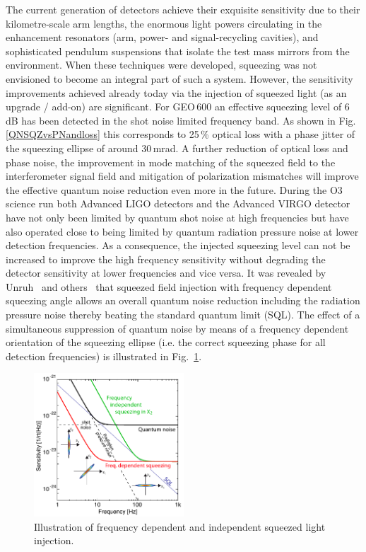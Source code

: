 The current generation of detectors achieve their exquisite sensitivity due to their kilometre-scale arm lengths, the enormous light powers circulating in the enhancement resonators (arm, power- and signal-recycling cavities), and sophisticated pendulum suspensions that isolate the test mass mirrors from the environment. When these techniques were developed, squeezing was not envisioned to become an integral part of such a system. However, the sensitivity improvements achieved already today via the injection of squeezed light (as an upgrade / add-on) are significant. For GEO\,600 an effective squeezing level of 6\,dB has been detected in the shot noise limited frequency band. As shown in Fig.\ref{QNSQZvsPNandloss} this corresponds to 25\,\% optical loss with a phase jitter of the squeezing ellipse of around 30\,mrad. A further reduction of optical loss and phase noise, the improvement in mode matching of the squeezed field to the interferometer signal field and mitigation of polarization mismatches will improve the effective quantum noise reduction even more in the future.
%
During the O3 science run both Advanced LIGO detectors and the Advanced VIRGO detector have not only been limited by quantum shot noise at high frequencies but have also operated close to being limited by quantum radiation pressure noise at lower detection frequencies. As a consequence, the injected squeezing level can not be increased to improve the high frequency sensitivity without degrading the detector sensitivity at lower frequencies and vice versa. 
%
It was revealed by Unruh~\cite{Unruh1982} and others~\cite{Yuen1983, Pace1993} that squeezed field injection with frequency dependent squeezing angle allows an overall quantum noise reduction including the radiation pressure noise thereby beating the standard quantum limit (SQL). The effect of a simultaneous suppression of quantum noise by means of a frequency dependent orientation of the squeezing ellipse (i.e. the correct squeezing phase for all detection frequencies) is illustrated in Fig.~\ref{UnruhFDS}.
%
%
\begin{figure}
	\centering
		\includegraphics[width=0.5\textwidth]{./Detector/DetFigures/UnruhFDS.pdf}
	\caption[Illustration of frequency dependent and independent squeezed light injection]{Illustration of frequency dependent and independent squeezed light injection.}
	\label{UnruhFDS}
\end{figure}

